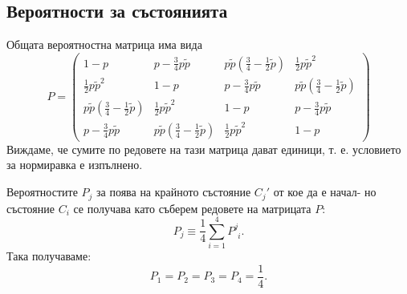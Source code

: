 \documentclass[english,bulgarian,a4paper,10pt]{article}
\begin{document}
\subsection{Вероятности за състоянията}
Общата вероятностна матрица има вида
\begin{equation}
 P = \begin{pmatrix}
       1-p &p-\frac{3}{4}p\tilde{p} &p\tilde{p}\left(\frac{3}{4}-\frac{1}{2}\tilde{p}\right) &\frac{1}{2}p\tilde{p}^{2}\\
       \frac{1}{2}p\tilde{p}^{2} &1-p &p-\frac{3}{4}p\tilde{p} &p\tilde{p}\left(\frac{3}{4}-\frac{1}{2}\tilde{p}\right)\\
       p\tilde{p}\left(\frac{3}{4}-\frac{1}{2}\tilde{p}\right) &\frac{1}{2}p\tilde{p}^{2} &1-p &p-\frac{3}{4}p\tilde{p}\\
       p-\frac{3}{4}p\tilde{p} &p\tilde{p}\left(\frac{3}{4}-\frac{1}{2}\tilde{p}\right) &\frac{1}{2}p\tilde{p}^{2} &1-p
\end{pmatrix}
\end{equation}
Виждаме, че сумите по редовете на тази матрица дават единици, т. е. условието
за нормиравка е изпълнено.

Вероятностите $P_j$ за поява на крайното състояние $C_{j}'$ от кое да е начал- но
състояние $C_i$ се получава като съберем редовете на матрицата $P$:
\begin{equation}
 P_{j} \equiv \frac{1}{4}\sum_{i=1}^{4} P^{j}_{\phantom{j}i}.
\end{equation}
Така получаваме:
\begin{equation}
 P_1=P_2=P_3=P_4=\frac{1}{4}.
\end{equation}
\end{document}
